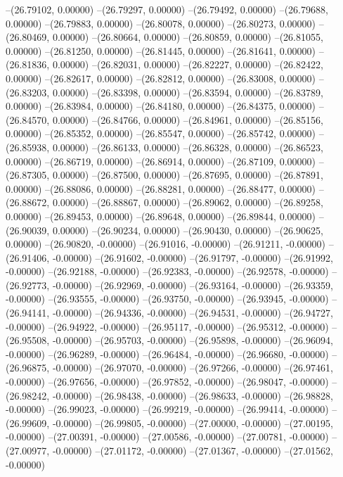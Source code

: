 --(26.79102, 0.00000)
--(26.79297, 0.00000)
--(26.79492, 0.00000)
--(26.79688, 0.00000)
--(26.79883, 0.00000)
--(26.80078, 0.00000)
--(26.80273, 0.00000)
--(26.80469, 0.00000)
--(26.80664, 0.00000)
--(26.80859, 0.00000)
--(26.81055, 0.00000)
--(26.81250, 0.00000)
--(26.81445, 0.00000)
--(26.81641, 0.00000)
--(26.81836, 0.00000)
--(26.82031, 0.00000)
--(26.82227, 0.00000)
--(26.82422, 0.00000)
--(26.82617, 0.00000)
--(26.82812, 0.00000)
--(26.83008, 0.00000)
--(26.83203, 0.00000)
--(26.83398, 0.00000)
--(26.83594, 0.00000)
--(26.83789, 0.00000)
--(26.83984, 0.00000)
--(26.84180, 0.00000)
--(26.84375, 0.00000)
--(26.84570, 0.00000)
--(26.84766, 0.00000)
--(26.84961, 0.00000)
--(26.85156, 0.00000)
--(26.85352, 0.00000)
--(26.85547, 0.00000)
--(26.85742, 0.00000)
--(26.85938, 0.00000)
--(26.86133, 0.00000)
--(26.86328, 0.00000)
--(26.86523, 0.00000)
--(26.86719, 0.00000)
--(26.86914, 0.00000)
--(26.87109, 0.00000)
--(26.87305, 0.00000)
--(26.87500, 0.00000)
--(26.87695, 0.00000)
--(26.87891, 0.00000)
--(26.88086, 0.00000)
--(26.88281, 0.00000)
--(26.88477, 0.00000)
--(26.88672, 0.00000)
--(26.88867, 0.00000)
--(26.89062, 0.00000)
--(26.89258, 0.00000)
--(26.89453, 0.00000)
--(26.89648, 0.00000)
--(26.89844, 0.00000)
--(26.90039, 0.00000)
--(26.90234, 0.00000)
--(26.90430, 0.00000)
--(26.90625, 0.00000)
--(26.90820, -0.00000)
--(26.91016, -0.00000)
--(26.91211, -0.00000)
--(26.91406, -0.00000)
--(26.91602, -0.00000)
--(26.91797, -0.00000)
--(26.91992, -0.00000)
--(26.92188, -0.00000)
--(26.92383, -0.00000)
--(26.92578, -0.00000)
--(26.92773, -0.00000)
--(26.92969, -0.00000)
--(26.93164, -0.00000)
--(26.93359, -0.00000)
--(26.93555, -0.00000)
--(26.93750, -0.00000)
--(26.93945, -0.00000)
--(26.94141, -0.00000)
--(26.94336, -0.00000)
--(26.94531, -0.00000)
--(26.94727, -0.00000)
--(26.94922, -0.00000)
--(26.95117, -0.00000)
--(26.95312, -0.00000)
--(26.95508, -0.00000)
--(26.95703, -0.00000)
--(26.95898, -0.00000)
--(26.96094, -0.00000)
--(26.96289, -0.00000)
--(26.96484, -0.00000)
--(26.96680, -0.00000)
--(26.96875, -0.00000)
--(26.97070, -0.00000)
--(26.97266, -0.00000)
--(26.97461, -0.00000)
--(26.97656, -0.00000)
--(26.97852, -0.00000)
--(26.98047, -0.00000)
--(26.98242, -0.00000)
--(26.98438, -0.00000)
--(26.98633, -0.00000)
--(26.98828, -0.00000)
--(26.99023, -0.00000)
--(26.99219, -0.00000)
--(26.99414, -0.00000)
--(26.99609, -0.00000)
--(26.99805, -0.00000)
--(27.00000, -0.00000)
--(27.00195, -0.00000)
--(27.00391, -0.00000)
--(27.00586, -0.00000)
--(27.00781, -0.00000)
--(27.00977, -0.00000)
--(27.01172, -0.00000)
--(27.01367, -0.00000)
--(27.01562, -0.00000)
